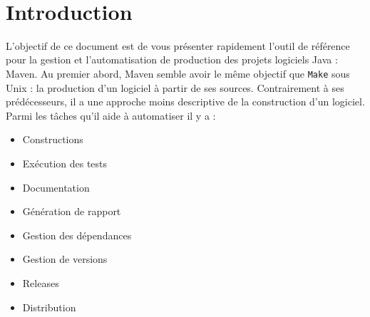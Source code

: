 \documentclass[a4paper,11pt]{article}
\date{}
\begin{document}

\newlength{\niveauZero}
\newlength{\niveauUn}
\newlength{\niveauDeux}
\newlength{\niveauTrois}
\newlength{\niveauQuatre}
\newlength{\niveauCinq}

\newlength{\colonneZero}
\newlength{\colonneUn}
\newlength{\colonneDeux}
\newlength{\colonneTrois}
\newlength{\colonneQuatre}
\newlength{\colonneCinq}


{\centering
    \mbox{
    }
}\\[0.4cm]
\section{Introduction}
L'objectif de ce document est de vous présenter rapidement l'outil de référence pour la gestion et l'automatisation 
de production des projets logiciels Java : Maven. Au premier abord, Maven semble avoir le même objectif que \texttt{Make} 
sous Unix : la production d'un logiciel à partir de ses sources. Contrairement à ses prédécesseurs, il a une approche 
moins descriptive de la construction d'un logiciel. Parmi les tâches qu'il aide à automatiser il y a :

\begin{itemize}
  \item Constructions
  \item Exécution des tests
  \item Documentation
  \item Génération de rapport
  \item Gestion des dépendances
  \item Gestion de versions
  \item Releases
  \item Distribution
\end{itemize}
\end{document}
